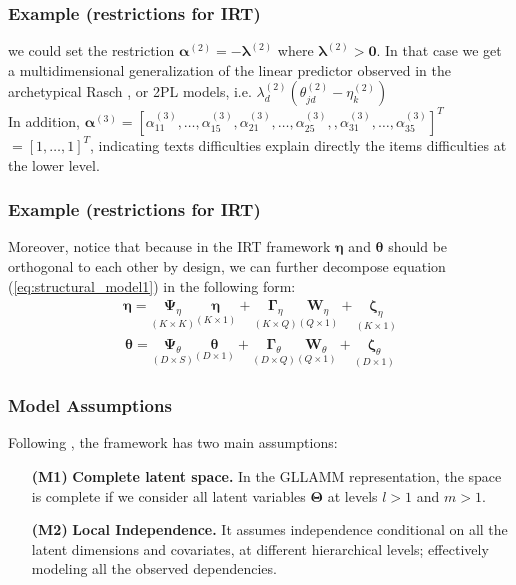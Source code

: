 \documentclass[nonav,sleutel]{beamer}
\begin{document}
	\begin{frame}
		\frametitle{Example (restrictions for IRT)}
		we could set the restriction $\pmb{\alpha}^{(2)} = -\pmb{\lambda}^{(2)}$ where $\pmb{\lambda}^{(2)} > \mathbf{0}$. In that case we get a multidimensional generalization of the linear predictor observed in the archetypical Rasch \cite{Rasch_1980}, or 2PL \cite{Lord_et_al_2008} models, i.e. $ \lambda^{(2)}_{d} (\theta^{(2)}_{jd} - \eta^{(2)}_{k} )$ \\
		\vspace{0.3cm} In addition, $\pmb{\alpha}^{(3)} = [ \alpha_{11}^{(3)}, \dots, \alpha_{15}^{(3)}, \alpha_{21}^{(3)}, \dots, \alpha_{25}^{(3)}, , \alpha_{31}^{(3)}, \dots, \alpha_{35}^{(3)} ]^{T}$ $= [1,\dots,1]^{T}$, indicating texts difficulties explain directly the items difficulties at the lower level.
	\end{frame}
	\begin{frame}
		\frametitle{Example (restrictions for IRT)}
		Moreover, notice that because in the IRT framework $\pmb{\eta}$ and $\pmb{\theta}$ should be orthogonal to each other by design, we can further decompose equation (\ref{eq:structural_model1}) in the following form:
		\begin{equation} \label{eq:structural_model2}
			\begin{split}
				\pmb{\eta} = \underset{(K \times K)}{\pmb{\Psi}_{\eta}} \underset{(K \times 1)}{\pmb{\eta}} + \underset{(K \times Q)}{\pmb{\Gamma}_{\eta}} \underset{(Q \times 1)}{\mathbf{W}_{\eta}} + \underset{(K \times 1)}{\pmb{\zeta}_{\eta}}
			\end{split}
		\end{equation}
		\begin{equation} \label{eq:structural_model3}
			\begin{split}
				\pmb{\theta} = \underset{(D \times S)}{\pmb{\Psi}_{\theta}} \underset{(D \times 1)}{\pmb{\theta}} + \underset{(D \times Q)}{\pmb{\Gamma}_{\theta}} \underset{(Q \times 1)}{\mathbf{W}_{\theta}} + \underset{(D \times 1)}{\pmb{\zeta}_{\theta}}
			\end{split}
		\end{equation}
	\end{frame}
	\begin{frame}
		\frametitle{Model Assumptions}
		Following \citet{Skrondal_et_al_2004a}, the framework has two main assumptions: 
		\begin{enumerate}
			\item[\textbf{(M1)}] \textbf{Complete latent space.}\citep{Hambleton_et_al_1991b} In the GLLAMM representation, the space is complete if we consider all latent variables $\pmb{\Theta}$ at levels $l > 1$ and $m > 1$.
			\item[\textbf{(M2)}] \textbf{Local Independence.} It assumes independence conditional on all the latent dimensions and covariates, at different hierarchical levels; effectively modeling all the observed dependencies.
		\end{enumerate}
	\end{frame}
\end{document}
